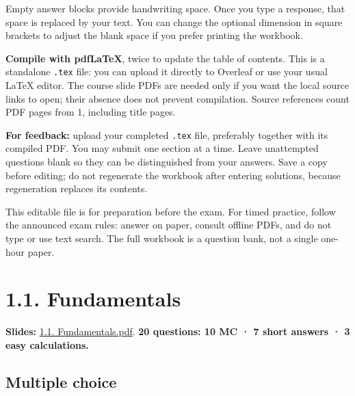Empty answer blocks provide handwriting space. Once you type a response,
that space is replaced by your text. You can change the optional
dimension in square brackets to adjust the blank space if you prefer
printing the workbook.

\textbf{Compile with pdfLaTeX}, twice to update the table of contents.
This is a standalone \texttt{.tex} file: you can upload it directly to
Overleaf or use your usual LaTeX editor. The course slide PDFs are
needed only if you want the local source links to open; their absence
does not prevent compilation. Source references count PDF pages from 1,
including title pages.

\textbf{For feedback:} upload your completed \texttt{.tex} file,
preferably together with its compiled PDF. You may submit one section at
a time. Leave unattempted questions blank so they can be distinguished
from your answers. Save a copy before editing; do not regenerate the
workbook after entering solutions, because regeneration replaces its
contents.

This editable file is for preparation before the exam. For timed
practice, follow the announced exam rules: answer on paper, consult
offline PDFs, and do not type or use text search. The full workbook is a
question bank, not a single one-hour paper.

\clearpage

\section{1.1. Fundamentals}\label{fundamentals}

\textbf{Slides:}
\href{../Lecture\%20Slides/1.1.\%20Fundamentals.pdf}{1.1.
Fundamentals.pdf}. \textbf{20 questions: 10 MC · 7 short answers · 3
easy calculations.}

\subsection{Multiple choice}\label{multiple-choice}

